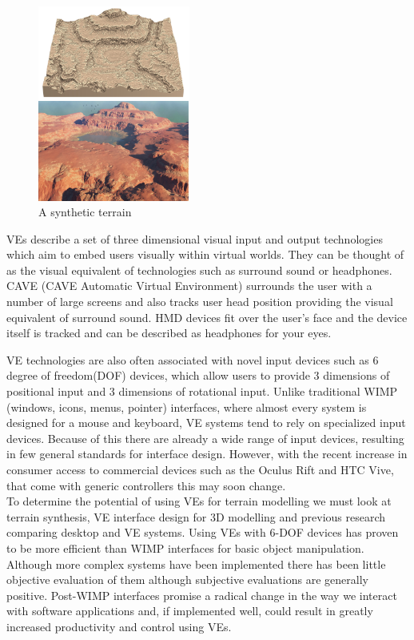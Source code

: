 \documentclass{sig-alternate-05-2015}
\begin{document}
\begin{figure}[H]
	\centering
	\includegraphics[width=5cm]{Terrain2}
	\caption{A synthetic terrain}
\end{figure} 
VEs describe a set of three dimensional visual input and output technologies which aim to embed users visually within virtual worlds. They can be thought of as the visual equivalent of technologies such as surround sound or headphones. CAVE (CAVE Automatic Virtual
Environment) surrounds the user with a number of large screens and also tracks user head position\cite{Cruz-Neira1993} providing the visual equivalent of surround sound. HMD devices fit over the user's face and the device itself is tracked and can be described as headphones for your eyes.\cite{Alger2015}

VE technologies are also often associated with novel input devices such as 6 degree of freedom(DOF) devices, which allow users to provide 3 dimensions of positional input and 3 dimensions of rotational input. Unlike traditional WIMP (windows, icons, menus, pointer) interfaces, where almost every system is designed for a mouse and keyboard, VE systems tend to rely on specialized input devices\cite{Hand1997,Bowman2001}. Because of this there are already a wide range of input devices, resulting in few general standards for interface design. However, with the recent increase in consumer access to commercial devices such as the Oculus Rift and HTC Vive, that come with generic controllers this may soon change.\\

To determine the potential of using VEs for terrain modelling  we must look at terrain synthesis, VE interface design for 3D modelling and previous research comparing desktop and VE systems. Using VEs with 6-DOF devices has proven to be more efficient than WIMP interfaces for basic object manipulation\cite{Schultheis2012,Scali2003}. Although more complex systems have been implemented there has been little objective evaluation of them although subjective evaluations are generally positive\cite{Wang2013,Mine2014,Jerald2013}. Post-WIMP interfaces promise a radical change in the way we interact with software applications and, if implemented well, could result in greatly increased productivity and control using VEs.
 
\end{document}

